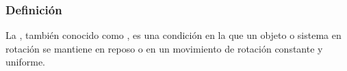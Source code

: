\documentclass[12pt]{beamer}
\begin{document}
\begin{frame}
\frametitle{Definición}
La , \pause también conocido como , \pause es una condición en la que un objeto o sistema en rotación se mantiene en reposo o en un movimiento de rotación constante y uniforme.
\end{frame}
\end{document}
